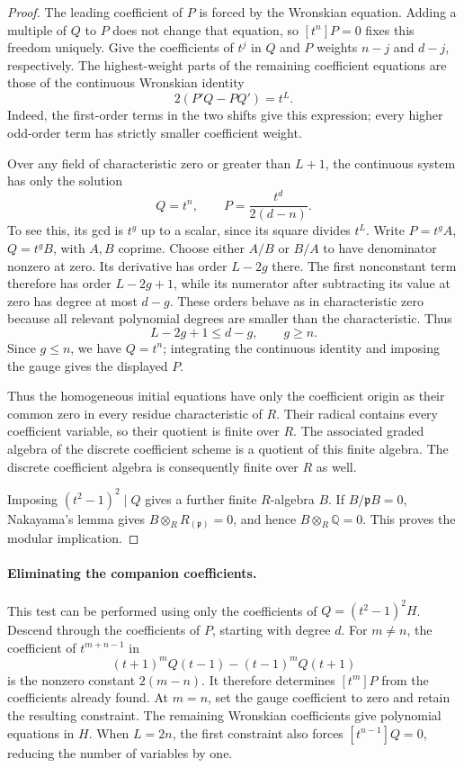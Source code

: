 \documentclass[11pt]{article}
\theoremstyle{definition}
\begin{document}
\begin{proof}
The leading coefficient of $P$ is forced by the Wronskian equation.
Adding a multiple of $Q$ to $P$ does not change that equation, so
$[t^n]P=0$ fixes this freedom uniquely. Give the coefficients of
$t^j$ in $Q$ and $P$ weights $n-j$ and $d-j$, respectively.
The highest-weight parts of the remaining coefficient equations
are those of the continuous Wronskian identity
\[
 2(P'Q-PQ')=t^L.
\]
Indeed, the first-order terms in the two shifts give this expression;
every higher odd-order term has strictly smaller coefficient weight.

Over any field of characteristic zero or greater than $L+1$, the
continuous system has only the solution
\[
 Q=t^n,\qquad P=\frac{t^d}{2(d-n)}.
\]
To see this, its gcd is $t^g$ up to a scalar, since its square divides
$t^L$. Write $P=t^g A$, $Q=t^g B$, with $A,B$ coprime.
Choose either $A/B$ or $B/A$ to have denominator nonzero at zero.
Its derivative has order $L-2g$ there. The first nonconstant term
therefore has order $L-2g+1$, while its numerator after subtracting
its value at zero has degree at most $d-g$. These orders behave as
in characteristic zero because all relevant polynomial degrees are
smaller than the characteristic. Thus
\[
 L-2g+1\le d-g,\qquad g\ge n.
\]
Since $g\le n$, we have $Q=t^n$; integrating the continuous identity
and imposing the gauge gives the displayed $P$.

Thus the homogeneous initial equations have only the coefficient
origin as their common zero in every residue characteristic of $R$.
Their radical contains every coefficient variable, so their quotient
is finite over $R$. The associated graded algebra of the discrete
coefficient scheme is a quotient of this finite algebra. The
discrete coefficient algebra is consequently finite over $R$ as well.

Imposing $(t^2-1)^2\mid Q$ gives a further finite $R$-algebra $B$.
If $B/\mathfrak pB=0$, Nakayama's lemma gives
$B\otimes_R R_{(\mathfrak p)}=0$, and hence
$B\otimes_R\mathbb Q=0$. This proves the modular implication.
\end{proof}

\paragraph{Eliminating the companion coefficients.}
This test can be performed using only the coefficients of
$Q=(t^2-1)^2H$. Descend through the coefficients of $P$, starting
with degree $d$. For $m\ne n$, the coefficient of $t^{m+n-1}$ in
\[
 (t+1)^mQ(t-1)-(t-1)^mQ(t+1)
\]
is the nonzero constant $2(m-n)$. It therefore determines
$[t^m]P$ from the coefficients already found. At $m=n$, set the
gauge coefficient to zero and retain the resulting constraint.
The remaining Wronskian coefficients give polynomial equations in
$H$. When $L=2n$, the first constraint also forces
$[t^{n-1}]Q=0$, reducing the number of variables by one.
\end{document}
